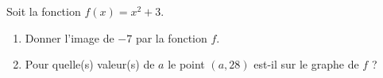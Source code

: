 
\begin{exercice}\label{exosmath-0439}

    Soit la fonction \( f(x)=x^2+3\).
    \begin{enumerate}
        \item
            Donner l'image de \( -7\) par la fonction \( f\).
        \item
            Pour quelle(s) valeur(s) de \( a\) le point \( (a,28)\) est-il sur le graphe de \( f\) ?
    \end{enumerate}

\end{exercice}

